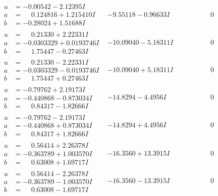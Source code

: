 \documentclass[1p]{elsarticle_modified}
\theoremstyle{definition}
\begin{document}
$$\begin{array}{c|c|c}
\begin{aligned}
u &= -0.00542 - 2.12395 I \\
a &= \phantom{-}0.124816 + 1.215410 I \\
b &= -0.28024 + 1.51688 I\end{aligned}
 & -9.55118 - 0.96633 I & \phantom{-0.000000 } 0 \\ \hline\begin{aligned}
u &= \phantom{-}0.21330 + 2.22331 I \\
a &= -0.0303329 + 0.0193746 I \\
b &= \phantom{-}1.75447 - 0.27463 I\end{aligned}
 & -10.09040 - 5.18311 I & \phantom{-0.000000 } 0 \\ \hline\begin{aligned}
u &= \phantom{-}0.21330 - 2.22331 I \\
a &= -0.0303329 - 0.0193746 I \\
b &= \phantom{-}1.75447 + 0.27463 I\end{aligned}
 & -10.09040 + 5.18311 I & \phantom{-0.000000 } 0 \\ \hline\begin{aligned}
u &= -0.79762 + 2.19173 I \\
a &= -0.440868 - 0.873034 I \\
b &= \phantom{-}0.84317 - 1.82666 I\end{aligned}
 & -14.8294 - 4.4956 I & \phantom{-0.000000 } 0 \\ \hline\begin{aligned}
u &= -0.79762 - 2.19173 I \\
a &= -0.440868 + 0.873034 I \\
b &= \phantom{-}0.84317 + 1.82666 I\end{aligned}
 & -14.8294 + 4.4956 I & \phantom{-0.000000 } 0 \\ \hline\begin{aligned}
u &= \phantom{-}0.56414 + 2.26378 I \\
a &= -0.363789 + 1.003570 I \\
b &= \phantom{-}0.63008 + 1.69717 I\end{aligned}
 & -16.3560 + 13.3915 I & \phantom{-0.000000 } 0 \\ \hline\begin{aligned}
u &= \phantom{-}0.56414 - 2.26378 I \\
a &= -0.363789 - 1.003570 I \\
b &= \phantom{-}0.63008 - 1.69717 I\end{aligned}
 & -16.3560 - 13.3915 I & \phantom{-0.000000 } 0 \\ \hline\begin{aligned}

\end{aligned}
\end{array}$$
\end{document}
